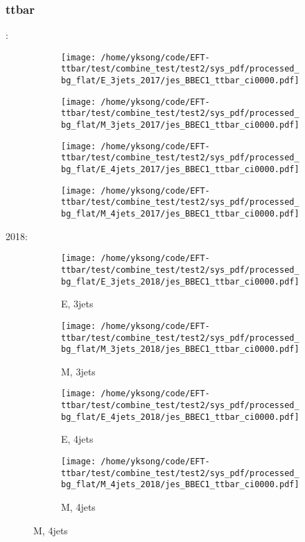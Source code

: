 \documentclass{beamer}
\begin{document}
\begin{frame}
\frametitle{ttbar}
\fontsize{5}{1}:
\begin{figure}
\centering
\begin{subfigure}[b]{0.24\textwidth}
\texttt{[image: /home/yksong/code/EFT-ttbar/test/combine\_test/test2/sys\_pdf/processed\_bg\_flat/E\_3jets\_2017/jes\_BBEC1\_ttbar\_ci0000.pdf]}
\end{subfigure}
\begin{subfigure}[b]{0.24\textwidth}
\texttt{[image: /home/yksong/code/EFT-ttbar/test/combine\_test/test2/sys\_pdf/processed\_bg\_flat/M\_3jets\_2017/jes\_BBEC1\_ttbar\_ci0000.pdf]}
\end{subfigure}
\begin{subfigure}[b]{0.24\textwidth}
\texttt{[image: /home/yksong/code/EFT-ttbar/test/combine\_test/test2/sys\_pdf/processed\_bg\_flat/E\_4jets\_2017/jes\_BBEC1\_ttbar\_ci0000.pdf]}
\end{subfigure}
\begin{subfigure}[b]{0.24\textwidth}
\texttt{[image: /home/yksong/code/EFT-ttbar/test/combine\_test/test2/sys\_pdf/processed\_bg\_flat/M\_4jets\_2017/jes\_BBEC1\_ttbar\_ci0000.pdf]}
\end{subfigure}
\end{figure}
2018:
\begin{figure}
\centering
\begin{subfigure}[b]{0.24\textwidth}
\texttt{[image: /home/yksong/code/EFT-ttbar/test/combine\_test/test2/sys\_pdf/processed\_bg\_flat/E\_3jets\_2018/jes\_BBEC1\_ttbar\_ci0000.pdf]}
\captionsetup{font=tiny}
\caption{E, 3jets}
\end{subfigure}
\begin{subfigure}[b]{0.24\textwidth}
\texttt{[image: /home/yksong/code/EFT-ttbar/test/combine\_test/test2/sys\_pdf/processed\_bg\_flat/M\_3jets\_2018/jes\_BBEC1\_ttbar\_ci0000.pdf]}
\captionsetup{font=tiny}
\caption{M, 3jets}
\end{subfigure}
\begin{subfigure}[b]{0.24\textwidth}
\texttt{[image: /home/yksong/code/EFT-ttbar/test/combine\_test/test2/sys\_pdf/processed\_bg\_flat/E\_4jets\_2018/jes\_BBEC1\_ttbar\_ci0000.pdf]}
\captionsetup{font=tiny}
\caption{E, 4jets}
\end{subfigure}
\begin{subfigure}[b]{0.24\textwidth}
\texttt{[image: /home/yksong/code/EFT-ttbar/test/combine\_test/test2/sys\_pdf/processed\_bg\_flat/M\_4jets\_2018/jes\_BBEC1\_ttbar\_ci0000.pdf]}
\captionsetup{font=tiny}
\caption{M, 4jets}
\end{subfigure}
\end{figure}
\end{frame}
\end{document}
